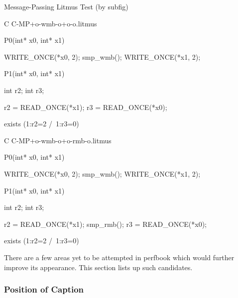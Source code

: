 
\begin{listing*}[tbh]%
\caption{Message-Passing Litmus Test (by subfig)}%
\label{lst:app:styleguide:Message-Passing Litmus Test (subfig)}%
{\scriptsize%
\begin{verbbox}[\LstLineNo]
C C-MP+o-wmb-o+o-o.litmus

{
}

P0(int* x0, int* x1) {

  WRITE_ONCE(*x0, 2);
  smp_wmb();
  WRITE_ONCE(*x1, 2);

}

P1(int* x0, int* x1) {

  int r2;
  int r3;

  r2 = READ_ONCE(*x1);
  r3 = READ_ONCE(*x0);

}


exists (1:r2=2 /\ 1:r3=0)
\end{verbbox}
}
\centering
\hspace*{\fill}
\hspace{\fill}
{\scriptsize%
\begin{verbbox}[\LstLineNo]
C C-MP+o-wmb-o+o-rmb-o.litmus

{
}

P0(int* x0, int* x1) {

  WRITE_ONCE(*x0, 2);
  smp_wmb();
  WRITE_ONCE(*x1, 2);

}

P1(int* x0, int* x1) {

  int r2;
  int r3;

  r2 = READ_ONCE(*x1);
  smp_rmb();
  r3 = READ_ONCE(*x0);

}

exists (1:r2=2 /\ 1:r3=0)
\end{verbbox}
}%
\hspace*{\fill}%
\end{listing*}

There are a few areas yet to be attempted in perfbook
which would further improve its appearance.
This section lists up such candidates.

\subsubsection{Position of Caption}
\label{sec:app:styleguide:Position of Caption}

